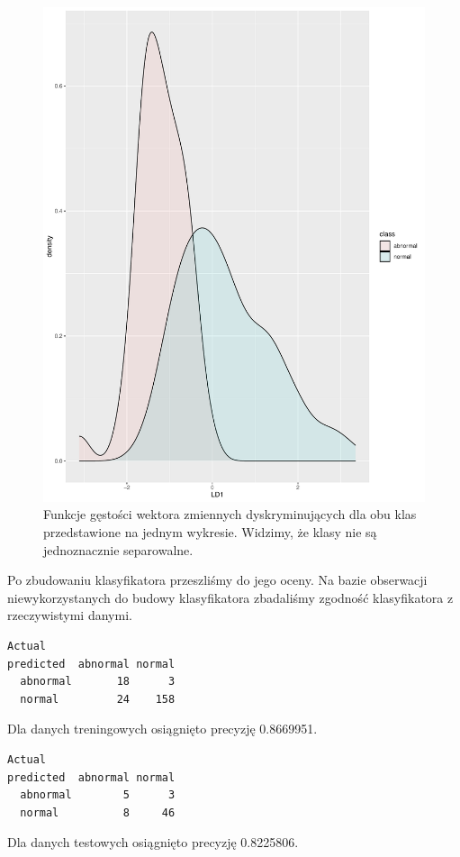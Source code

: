 \documentclass[10pt,a4paper]{article}
\begin{document}
\begin{figure}[H]
\includegraphics[scale=0.5]{density.pdf}
\caption{Funkcje gęstości wektora zmiennych dyskryminujących dla obu klas przedstawione na jednym wykresie. Widzimy, że klasy nie są jednoznacznie separowalne.}
\end{figure}

Po zbudowaniu klasyfikatora przeszliśmy do jego oceny. Na bazie obserwacji niewykorzystanych do budowy klasyfikatora zbadaliśmy zgodność klasyfikatora z rzeczywistymi danymi. 

\begin{lstlisting}[caption={Macierz pomyłek dla danych treningowych}]
          Actual
predicted  abnormal normal
  abnormal       18      3
  normal         24    158
\end{lstlisting}
Dla danych treningowych osiągnięto precyzję 0.8669951.

\begin{lstlisting}[caption={Macierz pomyłek dla danych testowych}]
          Actual
predicted  abnormal normal
  abnormal        5      3
  normal          8     46
\end{lstlisting}
Dla danych testowych osiągnięto precyzję 0.8225806.
\end{document}
